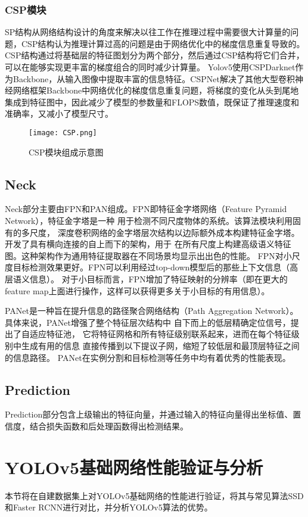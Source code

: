 \subsubsection{CSP模块}
SP结构从网络结构设计的角度来解决以往工作在推理过程中需要很大计算量的问题，CSP结构认为推理计算过高的问题是由于网络优化中的梯度信息重复导致的。CSP结构通过将基础层的特征图划分为两个部分，然后通过CSP结构将它们合并，可以在能够实现更丰富的梯度组合的同时减少计算量。
Yolov5使用CSPDarknet作为Backbone，从输入图像中提取丰富的信息特征。CSPNet解决了其他大型卷积神经网络框架Backbone中网络优化的梯度信息重复问题，将梯度的变化从头到尾地集成到特征图中，因此减少了模型的参数量和FLOPS数值，既保证了推理速度和准确率，又减小了模型尺寸。

\begin{figure}[h]
  \centering
  \texttt{[image: CSP.png]}
  \caption{CSP模块组成示意图}
  \label{csp}
\end{figure}

\subsection{Neck}
Neck部分主要由FPN和PAN组成。FPN即特征金字塔网络（Feature Pyramid Network），特征金字塔是一种
用于检测不同尺度物体的系统。该算法模块利用固有的多尺度，
深度卷积网络的金字塔层次结构以边际额外成本构建特征金字塔。开发了具有横向连接的自上而下的架构，用于
在所有尺度上构建高级语义特征图。这种架构作为通用特征提取器在不同场景均显示出出色的性能。
FPN对小尺度目标检测效果更好。FPN可以利用经过top-down模型后的那些上下文信息（高层语义信息）。
对于小目标而言，FPN增加了特征映射的分辨率（即在更大的feature map上面进行操作，这样可以获得更多关于小目标的有用信息）。

PANet是一种旨在提升信息的路径聚合网络结构（Path Aggregation Network）。
具体来说，PANet增强了整个特征层次结构中
自下而上的低层精确定位信号，提出了自适应特征池，
它将特征网格和所有特征级别联系起来，进而在每个特征级别中生成有用的信息
直接传播到以下提议子网，缩短了较低层和最顶层特征之间的信息路径。
PANet在实例分割和目标检测等任务中均有着优秀的性能表现。

\subsection{Prediction}
Prediction部分包含上级输出的特征向量，并通过输入的特征向量得出坐标值、置信度，结合损失函数和后处理函数得出检测结果。

\section{YOLOv5基础网络性能验证与分析}
本节将在自建数据集上对YOLOv5基础网络的性能进行验证，将其与常见算法SSD和Faster RCNN进行对比，并分析YOLOv5算法的优势。

